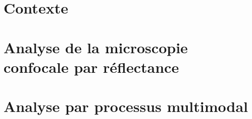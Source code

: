 \documentclass[english,standardlists]{spimubphdthesis}
\begin{document}
\mainmatter
\renewcommand\chaptermark[1]{\markboth{\uppercase{#1}}{}}
\renewcommand\glossarymark[1]{\markboth{\uppercase{#1}}{}}



\part{Contexte}
\label{part:contexte}





\part{Analyse de la microscopie confocale par réflectance}
\label{part:microscopy}





\part{Analyse par processus multimodal}
\label{part:multimodal}






% 


			
\backmatter

\renewcommand{\bibname}{Bibliographie}




\renewcommand*\listfigurename{Liste des figures}
\listoffigures

\listoftables



\printglossary[type=\acronymtype,style=listaltacr,title={Liste des acronymes}]%

\appendix
\end{document}
